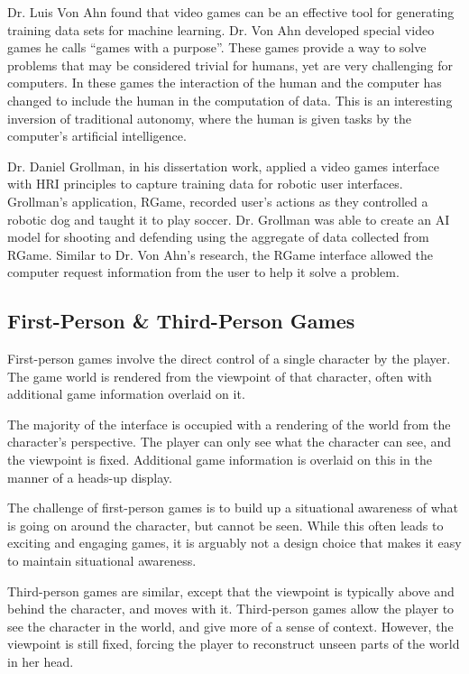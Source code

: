 Dr. Luis Von Ahn found that video games can be an effective tool for generating training data sets for machine learning. \cite{GWAP} Dr. Von Ahn developed special video games he calls ``games with a purpose''.  These games provide a way to solve problems that may be considered trivial for humans, yet are very challenging for computers. In these games the interaction of the human and the computer has changed to include the human in the computation of data. This is an interesting inversion of traditional autonomy, where the human is given tasks by the computer's artificial intelligence.


Dr. Daniel Grollman, in his dissertation work, applied a video games interface with HRI principles to capture training data for robotic user interfaces. \cite{Grollman} Grollman's application, RGame, recorded user’s actions as they controlled a robotic dog and taught it to play soccer. Dr. Grollman was able to create an AI model for shooting and defending using the aggregate of data collected from RGame. Similar to Dr. Von Ahn's research, the RGame interface allowed the computer request information from the user to help it solve a problem.

\subsection{First-Person \& Third-Person Games} %
\label{sub:first_person_games}
First-person games involve the direct control of a single character by the player. The game world is rendered from the viewpoint of that character, often with additional game information overlaid on it. 

The majority of the interface is occupied with a rendering of the world from the character’s perspective. The player can only see what the character can see, and the viewpoint is fixed. Additional game information is overlaid on this in the manner of a heads-up display.

The challenge of first-person games is to build up a situational awareness of what is going on around the character, but cannot be seen. While this often leads to exciting and engaging games, it is arguably not a design choice that makes it easy to maintain situational awareness.

Third-person games are similar, except that the viewpoint is typically above and behind the character, and moves with it. Third-person games allow the player to see the character in the world, and give more of a sense of context. However, the viewpoint is still fixed, forcing the player to reconstruct unseen parts of the world in her head.

